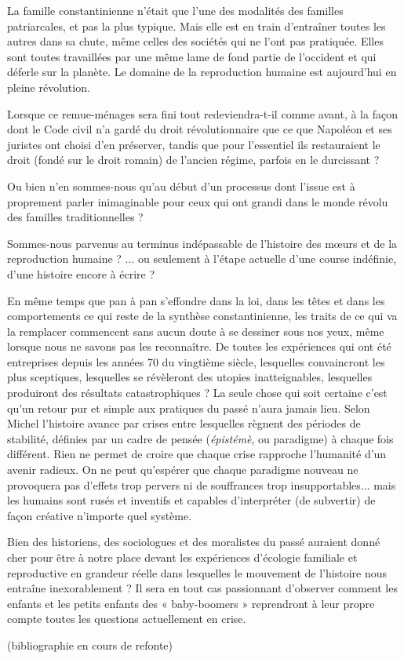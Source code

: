  La famille constantinienne n'était que l'une des modalités des familles patriarcales, et pas la plus typique. Mais elle est en train d'entraîner toutes les autres dans sa chute, même celles des sociétés qui ne l'ont pas pratiquée. Elles sont toutes travaillées par une même lame de fond partie de l'occident et qui déferle sur la planète. Le domaine de la reproduction humaine est aujourd'hui en pleine révolution.
  
 Lorsque ce remue-ménages sera fini tout redeviendra-t-il comme avant, à la façon dont le Code civil n'a gardé du droit révolutionnaire que ce que Napoléon et ses juristes ont choisi d'en préserver, tandis que pour l'essentiel ils restauraient le droit (fondé sur le droit romain) de l'ancien régime, parfois en le durcissant ? 
 
 Ou bien n'en sommes-nous qu'au début d'un processus dont l'issue est à proprement parler inimaginable pour ceux qui ont grandi dans le monde révolu des familles traditionnelles ?

 Sommes-nous parvenus au terminus indépassable de l'histoire des mœurs et de la reproduction humaine ? ... ou seulement à l'étape actuelle d'une course indéfinie, d'une histoire encore à écrire ? 
 
 

 En même temps que pan à pan s'effondre dans la loi, dans les têtes et dans les comportements ce qui reste de la synthèse constantinienne, les traits de ce qui va la remplacer commencent sans aucun doute à se dessiner sous nos yeux, même lorsque nous ne savons pas les reconnaître. De toutes les expériences qui ont été entreprises depuis les années 70 du vingtième siècle, lesquelles convaincront les plus sceptiques, lesquelles se révèleront des utopies inatteignables, lesquelles produiront des résultats catastrophiques ?  La seule chose qui soit certaine c'est qu'un retour pur et simple aux pratiques du passé n'aura jamais lieu. Selon Michel  l'histoire avance par crises entre lesquelles règnent des périodes de stabilité, définies par un cadre de pensée (\emph{épistémè}, ou paradigme) à chaque fois différent. Rien ne permet de croire que chaque crise rapproche l'humanité d'un avenir radieux. On ne peut qu'espérer que chaque paradigme nouveau ne provoquera pas d'effets trop pervers ni de souffrances trop insupportables... mais les humains sont rusés et inventifs et capables d'interpréter (de subvertir) de façon créative n'importe quel système.

Bien des historiens, des sociologues et des moralistes du passé auraient donné cher pour être à notre place devant les expériences d'écologie familiale et reproductive en grandeur réelle dans lesquelles le mouvement de l'histoire nous entraîne inexorablement ? Il sera en tout cas passionnant d'observer comment les enfants et les petits enfants des « baby-boomers » reprendront à leur propre compte toutes les questions actuellement en crise.


(bibliographie en cours de refonte)

